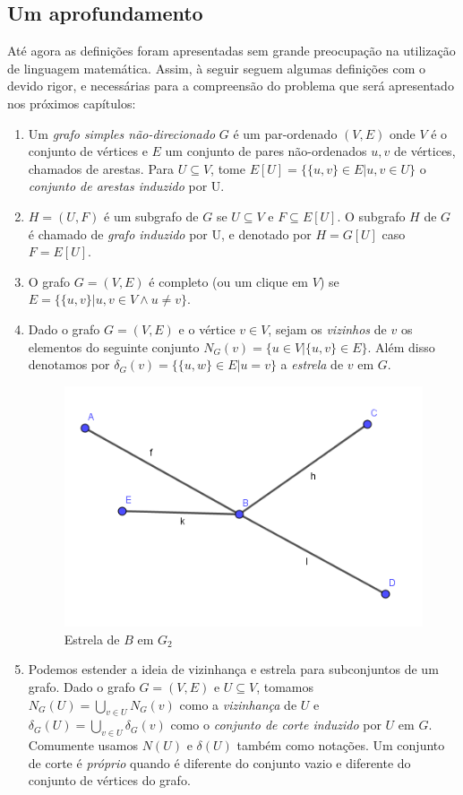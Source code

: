 \documentclass[a4paper,12pt]{article}
\begin{document}
	\subsection{Um aprofundamento}
	Até agora as definições foram apresentadas sem grande preocupação na utilização de linguagem matemática. Assim, à seguir seguem algumas definições com o devido rigor, e necessárias para a compreensão do problema que será apresentado nos próximos capítulos:
	\begin{enumerate}
		\item Um \textit{grafo simples não-direcionado} $G$ é um par-ordenado $(V,E)$ onde $V$ é o conjunto de vértices e $E$ um conjunto de pares não-ordenados ${u,v}$ de vértices, chamados de arestas. Para $U\subseteq V$, tome $E[U]=\{\{u,v\}\in E|u,v\in U\}$ o \textit{conjunto de arestas induzido} por U.
		\item $H=(U,F)$ é um subgrafo de $G$ se $U\subseteq V$ e $F\subseteq E[U]$. O subgrafo $H$ de $G$ é chamado de \textit{grafo induzido} por U, e denotado por $H=G[U]$ caso $F=E[U]$.
		\item O grafo $G=(V,E)$ é completo (ou um clique em $V$) se $E=\{\{u,v\} | u,v\in V\wedge u\neq v\}$.
		\item Dado o grafo $G=(V,E)$ e o vértice $v\in V$, sejam os \textit{vizinhos} de $v$ os elementos do seguinte conjunto $N_G(v)=\{u\in V | \{u,v\}\in E\}$. Além disso denotamos por $\delta_G(v)=\{\{u,w\}\in E|u=v\}$ a \textit{estrela} de $v$ em $G$. 
		\begin{figure}[H]
			\includegraphics[width=0.6\linewidth]{estrela.png}
			\caption{Estrela de $B$ em $G_2$}
			\label{}
		\end{figure}
		\item Podemos estender a ideia de vizinhança e estrela para subconjuntos de um grafo. Dado o grafo $G=(V,E)$ e $U\subseteq V$, tomamos $N_G(U)=\bigcup_{v\in U}N_G(v)$ como a \textit{vizinhança} de $U$ e $\delta_G(U)=\bigcup_{v\in U}\delta_G(v)$ como o \textit{conjunto de corte induzido} por $U$ em $G$. Comumente usamos $N(U)$ e $\delta(U)$ também como notações. Um conjunto de corte é \textit{próprio} quando é diferente do conjunto vazio e diferente do conjunto de vértices do grafo.

\end{enumerate}
\end{document}

